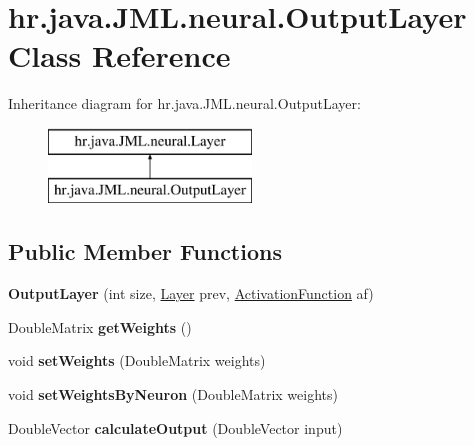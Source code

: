 \hypertarget{classhr_1_1java_1_1_j_m_l_1_1neural_1_1_output_layer}{\section{hr.\+java.\+J\+M\+L.\+neural.\+Output\+Layer Class Reference}
\label{classhr_1_1java_1_1_j_m_l_1_1neural_1_1_output_layer}
}
Inheritance diagram for hr.\+java.\+J\+M\+L.\+neural.\+Output\+Layer\+:\begin{figure}[H]
\begin{center}
\leavevmode
\includegraphics[height=2.000000cm]{classhr_1_1java_1_1_j_m_l_1_1neural_1_1_output_layer}
\end{center}
\end{figure}
\subsection*{Public Member Functions}
\begin{DoxyCompactItemize}
\item 
\hypertarget{classhr_1_1java_1_1_j_m_l_1_1neural_1_1_output_layer_a60cd948faf2fe4049151502c42a875b5}{{\bfseries Output\+Layer} (int size, \hyperlink{classhr_1_1java_1_1_j_m_l_1_1neural_1_1_layer}{Layer} prev, \hyperlink{classhr_1_1java_1_1_j_m_l_1_1activation_functions_1_1_activation_function}{Activation\+Function} af)}\label{classhr_1_1java_1_1_j_m_l_1_1neural_1_1_output_layer_a60cd948faf2fe4049151502c42a875b5}

\item 
\hypertarget{classhr_1_1java_1_1_j_m_l_1_1neural_1_1_output_layer_a5847f429677ba90474f98106eefc3a04}{Double\+Matrix {\bfseries get\+Weights} ()}\label{classhr_1_1java_1_1_j_m_l_1_1neural_1_1_output_layer_a5847f429677ba90474f98106eefc3a04}

\item 
\hypertarget{classhr_1_1java_1_1_j_m_l_1_1neural_1_1_output_layer_a04ec7b94907cdecc318a566e35c51f1b}{void {\bfseries set\+Weights} (Double\+Matrix weights)}\label{classhr_1_1java_1_1_j_m_l_1_1neural_1_1_output_layer_a04ec7b94907cdecc318a566e35c51f1b}

\item 
\hypertarget{classhr_1_1java_1_1_j_m_l_1_1neural_1_1_output_layer_a5b7d4d95e60adc494c27bd3a87901202}{void {\bfseries set\+Weights\+By\+Neuron} (Double\+Matrix weights)}\label{classhr_1_1java_1_1_j_m_l_1_1neural_1_1_output_layer_a5b7d4d95e60adc494c27bd3a87901202}

\item 
\hypertarget{classhr_1_1java_1_1_j_m_l_1_1neural_1_1_output_layer_abe9a367c255585c18beb2901f6bf2c89}{Double\+Vector {\bfseries calculate\+Output} (Double\+Vector input)}\label{classhr_1_1java_1_1_j_m_l_1_1neural_1_1_output_layer_abe9a367c255585c18beb2901f6bf2c89}

\end{DoxyCompactItemize}

